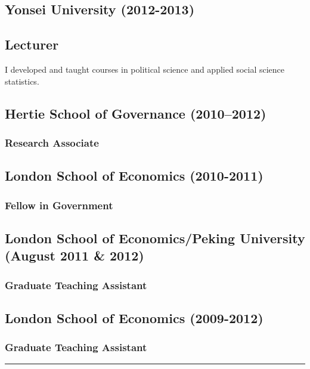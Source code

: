 \documentclass[a4paper]{article}
\begin{document}
\subsection*{Yonsei University (2012-2013)}
{\subsection*{Lecturer}

I developed and taught courses in political science and applied social science statistics.
\vspace{0.25cm}

\subsection*{Hertie School of Governance (2010--2012)}
\subsubsection*{Research Associate}

\subsection*{London School of Economics (2010-2011)}
\subsubsection*{Fellow in Government}

\subsection*{London School of Economics/Peking University (August 2011 \& 2012)}
\subsubsection*{Graduate Teaching Assistant}

\subsection*{London School of Economics (2009-2012)}
\subsubsection*{Graduate Teaching Assistant}

\vspace{0.25cm}
\medskip\hrule height 1pt
\vspace{0.5cm}


}
\end{document}
